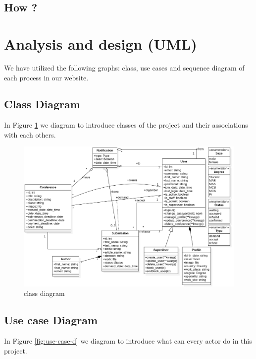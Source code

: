 \documentclass[12pt,a4paper]{article}
\begin{document}
		\subsection{How ?}
	
	\clearpage
	\section{Analysis and design (UML)}
	We have utilized the following graphs: class, use cases and sequence diagram of each process in our website.
	
	\subsection{Class Diagram}
	In Figure \ref{fig:class-d} we diagram to introduce classes of the project and their associations with each others.
	
		\begin{figure}[b]
			\centering
			\includegraphics[width=\textwidth]{diagrams/class.png}
			\caption{class diagram}
			\label{fig:class-d}
		\end{figure}

	\subsection{Use case Diagram}
	In Figure \ref{fig:use-case-d} we diagram to introduce what can every actor do in this project.
	
\end{document}
